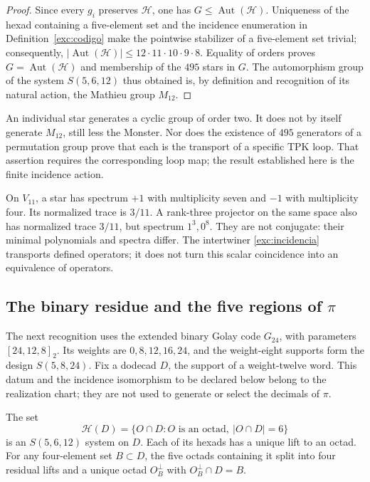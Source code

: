 \begin{proof}
Since every $g_i$ preserves $\mathcal H$, one has
$G\leq\operatorname{Aut}(\mathcal H)$. Uniqueness of the hexad
containing a five-element set and the incidence enumeration in
Definition~\ref{exc:codigo} make the pointwise stabilizer of a
five-element set trivial; consequently,
$|\operatorname{Aut}(\mathcal H)|\leq
12\cdot11\cdot10\cdot9\cdot8$. Equality of orders proves
$G=\operatorname{Aut}(\mathcal H)$ and membership of the $495$ stars
in $G$. The automorphism group of the system $S(5,6,12)$ thus obtained is,
by definition and recognition of its natural action, the Mathieu group
$M_{12}$.
\end{proof}

An individual star generates a cyclic group of order two. It does
not by itself generate $M_{12}$, still less the Monster. Nor does the
existence of $495$ generators of a permutation group prove that
each is the transport of a specific TPK loop. That assertion
requires the corresponding loop map; the result established here
is the finite incidence action.

\begin{remark}
On $V_{11}$, a star has spectrum $+1$ with multiplicity seven
and $-1$ with multiplicity four. Its normalized trace is $3/11$.
A rank-three projector on the same space also has normalized
trace $3/11$, but spectrum $1^3,0^8$. They are not conjugate: their
minimal polynomials and spectra differ. The intertwiner
\eqref{exc:incidencia} transports defined operators; it does not turn
this scalar coincidence into an equivalence of operators.
\end{remark}

\subsection{The binary residue and the five regions of \texorpdfstring{$\pi$}{pi}}
\label{exc:cinco-regiones}

The next recognition uses the extended binary Golay code
$G_{24}$, with parameters $[24,12,8]_2$. Its weights are
$0,8,12,16,24$, and the weight-eight supports form the design
$S(5,8,24)$. Fix a dodecad $D$, the support of a weight-twelve
word. This datum and the incidence isomorphism to be declared
below belong to the realization chart; they are not used to
generate or select the decimals of $\pi$.

\begin{proposition}
\label{exc:residuo-binario}
The set
\[
 \mathcal H(D)=
 \{O\cap D: O\text{ is an octad},\ |O\cap D|=6\}
\]
is an $S(5,6,12)$ system on $D$. Each of its hexads has
a unique lift to an octad. For any four-element set $B\subset D$,
the five octads containing it split into four residual
lifts and a unique octad $O_B^\perp$ with $O_B^\perp\cap D=B$.
\end{proposition}

